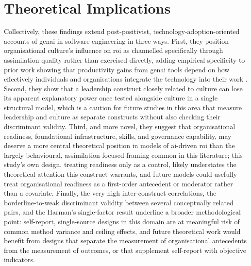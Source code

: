 \section{Theoretical Implications}
\label{sec:Theoretical Implications}
Collectively, these findings extend post-positivist, technology-adoption-oriented accounts of \gls{genai} in software engineering in three ways. First, they position organisational culture's influence on \gls{roi} as channelled specifically through assimilation quality rather than exercised directly, adding empirical specificity to prior work showing that productivity gains from \gls{genai} tools depend on how effectively individuals and organisations integrate the technology into their work \autocite{Brynjolfsson2025,Noy2023}. Second, they show that a leadership construct closely related to culture can lose its apparent explanatory power once tested alongside culture in a single structural model, which is a caution for future studies in this area that measure leadership and culture as separate constructs without also checking their discriminant validity. Third, and more novel, they suggest that organisational readiness, foundational infrastructure, skills, and governance capability, may deserve a more central theoretical position in models of \gls{ai}-driven \gls{roi} than the largely behavioural, assimilation-focused framing common in this literature; this study's own design, treating readiness only as a control, likely understates the theoretical attention this construct warrants, and future models could usefully treat organisational readiness as a first-order antecedent or moderator rather than a covariate. Finally, the very high inter-construct correlations, the borderline-to-weak discriminant validity between several conceptually related pairs, and the Harman's single-factor result underline a broader methodological point: self-report, single-source designs in this domain are at meaningful risk of common method variance and ceiling effects, and future theoretical work would benefit from designs that separate the measurement of organisational antecedents from the measurement of outcomes, or that supplement self-report with objective indicators.

